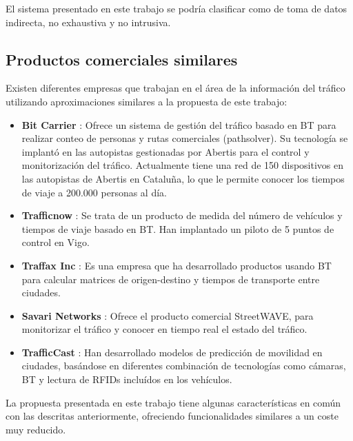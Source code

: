\documentclass[twocolumn,twoside]{Jornadas}
\begin{document}
El sistema presentado en este trabajo se podría clasificar como de toma de datos indirecta, no exhaustiva y no intrusiva.


\subsection{Productos comerciales similares}

Existen diferentes empresas que trabajan en el área de la información del tráfico utilizando aproximaciones similares a la propuesta de este trabajo:

\begin{itemize}

 \item \textbf{Bit Carrier} \cite{patenteBC} \cite{BitCarrier}: Ofrece un sistema de gestión del tráfico basado en BT para realizar conteo de personas y rutas comerciales 
(pathsolver). Su tecnología se implantó en las autopistas gestionadas por Abertis para el control y monitorización del tráfico. Actualmente tiene una red de 
150 dispositivos en las autopistas de Abertis en Cataluña, lo que le permite conocer los tiempos de viaje a 200.000 personas al día.

 \item \textbf{Trafficnow} \cite{Trafficnow}: Se trata de un producto de medida del número de vehículos y tiempos de viaje basado en BT. Han implantado 
un piloto de 5 puntos de control en Vigo.

 \item \textbf{Traffax Inc} \cite{TraffaxInc}: Es una empresa que ha desarrollado productos usando BT para calcular matrices de origen-destino y tiempos de transporte entre ciudades.

 \item \textbf{Savari Networks} \cite{SavariNetworks}: Ofrece el producto comercial StreetWAVE, para monitorizar el tráfico y conocer en tiempo real el estado del tráfico.

 \item \textbf{TrafficCast} \cite{TrafficCast}: Han desarrollado modelos de predicción de movilidad en ciudades, basándose en diferentes 
combinación de tecnologías como cámaras, BT y lectura de RFIDs incluídos en los vehículos.

\end{itemize}


La propuesta presentada en este trabajo tiene algunas características en común con las descritas anteriormente, ofreciendo funcionalidades similares a un coste muy reducido. 
\end{document}
